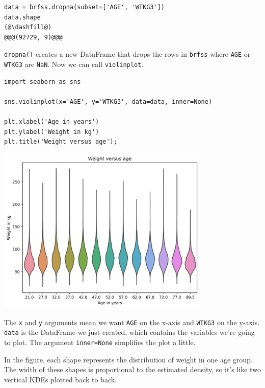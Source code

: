 \begin{lstlisting}[]
data = brfss.dropna(subset=['AGE', 'WTKG3'])
data.shape
(@\dashfill@)
@@@(92729, 9)@@@
\end{lstlisting}

\passthrough{\lstinline!dropna()!} creates a new DataFrame that drops
the rows in \passthrough{\lstinline!brfss!} where
\passthrough{\lstinline!AGE!} or \passthrough{\lstinline!WTKG3!} are
\passthrough{\lstinline!NaN!}. Now we can call
\passthrough{\lstinline!violinplot!}.

\begin{lstlisting}[]
import seaborn as sns

sns.violinplot(x='AGE', y='WTKG3', data=data, inner=None)

plt.xlabel('Age in years')
plt.ylabel('Weight in kg')
plt.title('Weight versus age');
\end{lstlisting}

\begin{center}
\includegraphics[width=4in]{chapters/09_relationships_files/09_relationships_42_0.png}
\end{center}

The \passthrough{\lstinline!x!} and \passthrough{\lstinline!y!}
arguments mean we want \passthrough{\lstinline!AGE!} on the x-axis and
\passthrough{\lstinline!WTKG3!} on the y-axis.
\passthrough{\lstinline!data!} is the DataFrame we just created, which
contains the variables we're going to plot. The argument
\passthrough{\lstinline!inner=None!} simplifies the plot a little.

In the figure, each shape represents the distribution of weight in one
age group. The width of these shapes is proportional to the estimated
density, so it's like two vertical KDEs plotted back to back.

